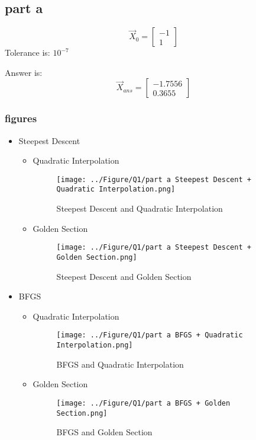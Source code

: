 \subsection{part a}
$$\vec X_0 = \begin{bmatrix}
	-1\\1
\end{bmatrix}$$
Tolerance is: $10^{-7}$


Answer is:
$$\vec X_{ans} = \begin{bmatrix}
	-1.7556\\
	0.3655
\end{bmatrix}$$
\subsubsection{figures}
\newpage
\begin{itemize}
	\item Steepest Descent
	\begin{itemize}
		\item Quadratic Interpolation
		\begin{figure}[H]
			\caption{Steepest Descent and Quadratic Interpolation}
			\centering
			\texttt{[image: ../Figure/Q1/part a Steepest Descent + Quadratic Interpolation.png]}
		\end{figure}
		\item Golden Section
		\begin{figure}[H]
			\caption{Steepest Descent and Golden Section}
			\centering
			\texttt{[image: ../Figure/Q1/part a Steepest Descent + Golden Section.png]}
		\end{figure}
	\end{itemize}
	\item BFGS
	\begin{itemize}
		\item Quadratic Interpolation
		\begin{figure}[H]
			\caption{BFGS and Quadratic Interpolation}
			\centering
			\texttt{[image: ../Figure/Q1/part a BFGS + Quadratic Interpolation.png]}
		\end{figure}
		\item Golden Section
			\begin{figure}[H]
				\caption{BFGS and Golden Section}
				\centering
				\texttt{[image: ../Figure/Q1/part a BFGS + Golden Section.png]}
		\end{figure}
	\end{itemize}
\end{itemize}
